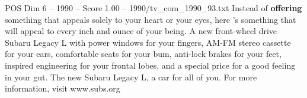 \begin{textsample}{POS Dim 6 – 1990 – Score 1.00 – 1990/tv\_com\_1990\_93.txt}  \label{ex:f6_pos_076}
Instead of \textbf{offering} something that appeals solely to your heart or your eyes, here 's something that will appeal to every inch and ounce of your being.
A new front-wheel drive Subaru Legacy L with power windows for your fingers, AM-FM stereo cassette for your ears, comfortable seats for your bum, anti-lock brakes for your feet, inspired engineering for your frontal lobes, and a special price for a good feeling in your gut.
The new Subaru Legacy L, a car for all of you.
For more information, visit www.subs.org

\end{textsample}

